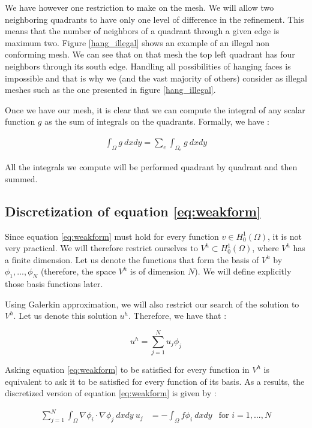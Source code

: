 We have however one restriction to make on the mesh. We will allow two neighboring quadrants to have only one level of difference in the refinement. This means that the number of neighbors of a quadrant through a given edge is maximum two. Figure \ref{hang_illegal} shows an example of an illegal non conforming mesh. We can see that on that mesh the top left quadrant has four neighbors through its south edge. Handling all possibilities of hanging faces is impossible and that is why we (and the vast majority of others) consider as illegal meshes such as the one presented in figure \ref{hang_illegal}.

Once we have our mesh, it is clear that we can compute the integral of any scalar function $g$ as the sum of integrals on the quadrants. Formally, we have :  

\begin{align}
\int_\Omega g\:dxdy = \sum_e \int_{\Omega_e} g\:dxdy \label{eq:int}
\end{align}

All the integrals we compute will be performed quadrant by quadrant and then summed. 

\subsection{Discretization of equation \ref{eq:weakform}}

Since equation \ref{eq:weakform} must hold for every function $v \in H_0^1(\Omega)$, it is not very practical. We will therefore restrict ourselves to $V^h \subset H_0^1(\Omega)$, where $V^h$ has a finite dimension. Let us denote the functions that form the basis of $V^h$ by $\phi_1,..., \phi_N$ (therefore, the space $V^h$ is of dimension $N$). We will define explicitly those basis functions later. 

Using Galerkin approximation, we will also restrict our search of the solution to $V^h$. Let us denote this solution $u^h$. Therefore, we have that : 

$$u^h = \sum_{j=1}^N u_j \phi_j $$

Asking equation \ref{eq:weakform} to be satisfied for every function in $V^h$ is equivalent to ask it to be satisfied for every function of its basis. As a results, the discretized version of equation \ref{eq:weakform} is given by : 

\begin{align}
\sum_{j = 1}^N \int_\Omega \nabla \phi_i \cdot \nabla \phi_j \:dxdy \: u_j &= -\int_\Omega f\phi_i \:dxdy &\text{for $i=1,...,N$} 
\end{align}

